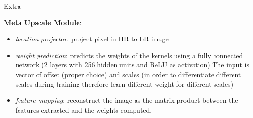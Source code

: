 \documentclass[
    xcolor={svgnames},
    hyperref={colorlinks,citecolor=OrangeRed,linkcolor=OrangeRed,urlcolor=DarkBlue}
    ]{beamer}
\begin{document}
\begin{frame}{Extra}
{        \textbf{Meta Upscale Module}:
        \begin{itemize}
            \tiny
            \item \textit{location projector}: project pixel in HR to LR image
            \item \textit{weight prediction}: predicts the weights of the kernels using a fully connected network (2 layers with 256 hidden units and ReLU as activation)
            The input is vector of offset (proper choice) and scales (in order to differentiate different scales during training therefore learn different weight for different scales).
            \item \textit{feature mapping}: reconstruct the image as the matrix product between the features extracted and the weights computed.
        \end{itemize}
    }


\end{frame}
\end{document}
